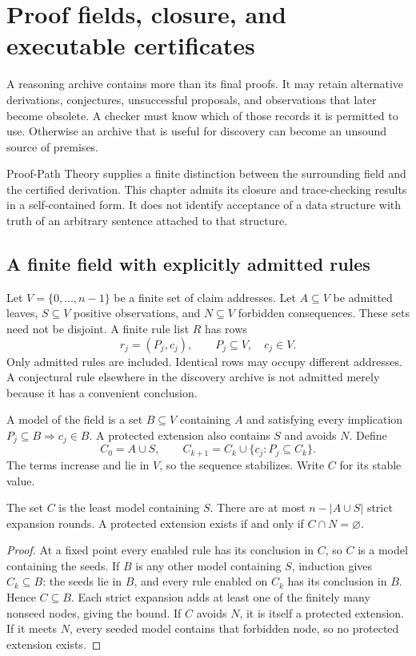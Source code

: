 \chapter{Proof fields, closure, and executable certificates}\label{ch:prooffields}

A reasoning archive contains more than its final proofs. It may retain alternative derivations, conjectures, unsuccessful proposals, and observations that later become obsolete. A checker must know which of those records it is permitted to use. Otherwise an archive that is useful for discovery can become an unsound source of premises.

Proof-Path Theory supplies a finite distinction between the surrounding field and the certified derivation. This chapter admits its closure and trace-checking results in a self-contained form. It does not identify acceptance of a data structure with truth of an arbitrary sentence attached to that structure.

\section{A finite field with explicitly admitted rules}
Let $V=\{0,\ldots,n-1\}$ be a finite set of claim addresses. Let $A\subseteq V$ be admitted leaves, $S\subseteq V$ positive observations, and $N\subseteq V$ forbidden consequences. These sets need not be disjoint. A finite rule list $R$ has rows
\[
 r_j=(P_j,c_j),\qquad P_j\subseteq V,\quad c_j\in V.
\]
Only admitted rules are included. Identical rows may occupy different addresses. A conjectural rule elsewhere in the discovery archive is not admitted merely because it has a convenient conclusion.

A model of the field is a set $B\subseteq V$ containing $A$ and satisfying every implication $P_j\subseteq B\Rightarrow c_j\in B$. A protected extension also contains $S$ and avoids $N$. Define
\[
 C_0=A\cup S,\qquad
 C_{k+1}=C_k\cup\{c_j:P_j\subseteq C_k\}.
\]
The terms increase and lie in $V$, so the sequence stabilizes. Write $C$ for its stable value.

\begin{proposition}\label{r:field-closure}
The set $C$ is the least model containing $S$. There are at most $n-|A\cup S|$ strict expansion rounds. A protected extension exists if and only if $C\cap N=\varnothing$.
\end{proposition}
\begin{proof}
At a fixed point every enabled rule has its conclusion in $C$, so $C$ is a model containing the seeds. If $B$ is any other model containing $S$, induction gives $C_k\subseteq B$: the seeds lie in $B$, and every rule enabled on $C_k$ has its conclusion in $B$. Hence $C\subseteq B$. Each strict expansion adds at least one of the finitely many nonseed nodes, giving the bound. If $C$ avoids $N$, it is itself a protected extension. If it meets $N$, every seeded model contains that forbidden node, so no protected extension exists.
\end{proof}

